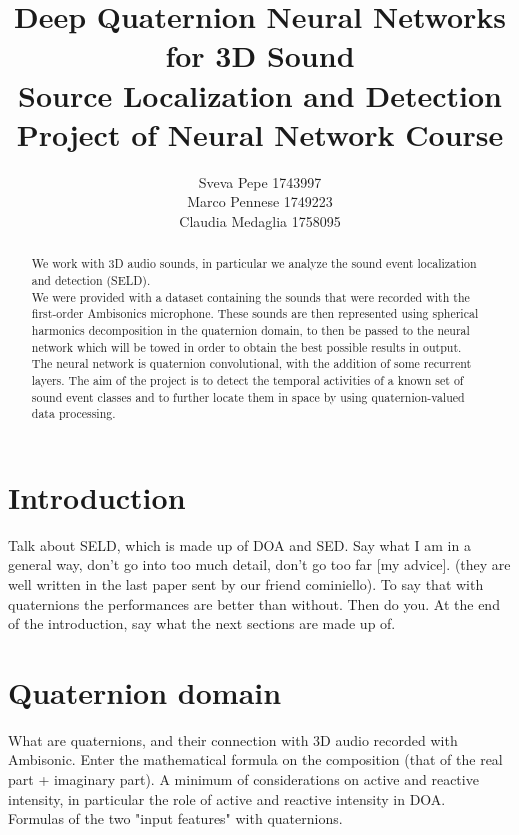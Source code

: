 \documentclass{article}
\title{Deep Quaternion Neural Networks for 3D Sound \\ Source Localization and Detection
\\ \large{\vspace{0.4cm}Project of Neural Network Course}}
\author{Sveva Pepe 1743997 \\  Marco Pennese 1749223 \\  Claudia Medaglia 1758095}
\date{}
\begin{document}
    \maketitle
    \begin{abstract}
        We work with 3D audio sounds, in particular we analyze the sound event localization and detection (SELD). 
        \\ We were provided with a dataset containing the sounds that were recorded with the first-order Ambisonics microphone. 
        These sounds are then represented using spherical harmonics decomposition in the quaternion domain, to then be passed to 
        the neural network which will be towed in order to obtain the best possible results in output.
        \\ The neural network is quaternion convolutional, with the addition of some recurrent layers.
        The aim of the project is to detect the temporal activities of a known set of sound event classes and to further locate them 
        in space by using quaternion-valued data processing.
    \end{abstract}
    \section{Introduction}
    Talk about SELD, which is made up of DOA and SED. Say what I am in a general way, don't go into too much detail, don't go too 
    far [my advice]. (they are well written in the last paper sent by our friend cominiello).
    To say that with quaternions the performances are better than without.
    Then do you.
    At the end of the introduction, say what the next sections are made up of. 
    \section{Quaternion domain}
    What are quaternions, and their connection with 3D audio recorded with Ambisonic.
    Enter the mathematical formula on the composition (that of the real part + imaginary part).
    A minimum of considerations on active and reactive intensity, in particular
    the role of active and reactive intensity in DOA.
    \\ Formulas of the two "input features" with quaternions.
\end{document}
